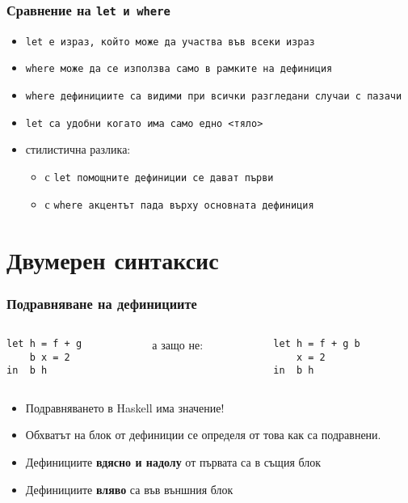\documentclass{beamer}
\begin{document}
\begin{frame}
  \frametitle{Сравнение на \tt{let} и \tt{where}}
  \begin{itemize}[<+->]
  \item \tt{let} е израз, който може да участва във всеки израз
  \item \tt{where} може да се използва само в рамките на дефиниция
  \item \tt{where} дефинициите са видими при всички разгледани случаи с пазачи
  \item \tt{let} са удобни когато има само едно <тяло>
  \item стилистична разлика:
    \begin{itemize}
    \item с \tt{let} помощните дефиниции се дават първи
    \item с \tt{where} акцентът пада върху основната дефиниция
    \end{itemize}
  \end{itemize}
\end{frame}

\section{Двумерен синтаксис}

\begin{frame}[fragile]
  \frametitle{Подравняване на дефинициите}
  \begin{columns}[onlytextwidth]
    \begin{column}{0.35\textwidth}
\begin{verbatim}
let h = f + g
    b x = 2
in  b h
\end{verbatim}
    \end{column}
    \pause
    \begin{column}{0.3\textwidth}
      а защо не:
    \end{column}
    \begin{column}{0.35\textwidth}
\begin{verbatim}
let h = f + g b
    x = 2
in  b h
\end{verbatim}
    \end{column}
  \end{columns}
  \vspace{1em}
\onslide<+->
\begin{itemize}[<+->]
\item \alert{Подравняването в Haskell има значение!}
\item Обхватът на блок от дефиниции се определя от това как са подравнени.
\item Дефинициите \textbf{вдясно и надолу} от първата са в същия блок
\item Дефинициите \textbf{вляво} са във външния блок
\end{itemize}
\end{frame}
\end{document}
